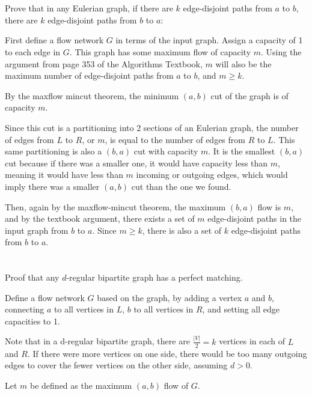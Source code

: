 \documentclass{article}
\begin{document}
\section{}

Prove that in any Eulerian graph, if there are $k$ edge-disjoint paths from $a$
to $b$, there are $k$ edge-disjoint paths from $b$ to $a$:

First define a flow network $G$ in terms of the input graph. Assign a capacity
of 1 to each edge in $G$. This graph has some maximum flow of capacity $m$.
Using the argument from page 353 of the Algorithms Textbook, $m$ will also be the
maximum number of edge-disjoint paths from $a$ to $b$, and $m \geq k$.

By the maxflow mincut theorem, the minimum $(a,b)$ cut of the graph is of capacity
$m$.

Since this cut is a partitioning into 2 sections of an Eulerian graph, the
number of edges from $L$ to $R$, or $m$, is equal to the number of edges from $R$ to
$L$. This same partitioning is also a $(b,a)$ cut with capacity $m$. It is the
smallest $(b,a)$ cut because if there was a smaller one, it would have
capacity less than $m$, meaning it would have less than $m$ incoming or
outgoing edges, which would imply there was a smaller $(a,b)$ cut than the one
we found.

Then, again by the maxflow-mincut theorem, the maximum $(b,a)$ flow is $m$,
and by the textbook argument, there exists a set of $m$ edge-disjoint paths in
the input graph from $b$ to $a$. Since $m \geq k$, there is also a set of $k$
edge-disjoint paths from $b$ to $a$.

\section{}

Proof that any $d$-regular bipartite graph has a perfect matching.

Define a flow network $G$ based on the graph, by adding a vertex $a$ and $b$,
connecting $a$ to all vertices in $L$, $b$ to all vertices in $R$, and setting
all edge capacities to 1.

Note that in a d-regular bipartite graph, there are $\frac{|V|}{2} = k$
vertices in each of $L$ and $R$. If there were more vertices on one side,
there would be too many outgoing edges to cover the fewer vertices on the
other side, assuming $d > 0$.

Let $m$ be defined as the maximum $(a,b)$ flow of $G$.
\end{document}

